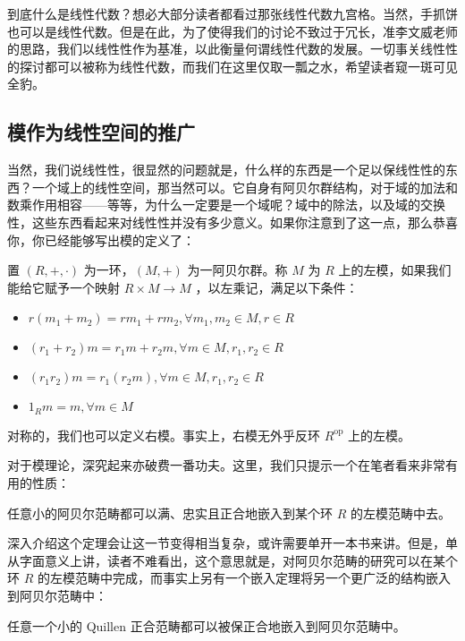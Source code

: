 到底什么是线性代数？想必大部分读者都看过那张线性代数九宫格。当然，手抓饼也可以是线性代数。但是在此，为了使得我们的讨论不致过于冗长，准李文威老师的思路，我们以线性性作为基准，以此衡量何谓线性代数的发展。一切事关线性性的探讨都可以被称为线性代数，而我们在这里仅取一瓢之水，希望读者窥一斑可见全豹。

\subsection{模作为线性空间的推广}

当然，我们说线性性，很显然的问题就是，什么样的东西是一个足以保线性性的东西？一个域上的线性空间，那当然可以。它自身有阿贝尔群结构，对于域的加法和数乘作用相容——等等，为什么一定要是一个域呢？域中的除法，以及域的交换性，这些东西看起来对线性性并没有多少意义。如果你注意到了这一点，那么恭喜你，你已经能够写出模的定义了：

\begin{definition}
    置 $(R, +, \cdot)$ 为一环，$(M, +)$ 为一阿贝尔群。称 $M$ 为 $R$ 上的左模，如果我们能给它赋予一个映射 $R \times M \to M$ ，以左乘记，满足以下条件：

    \begin{itemize}
        \item $r(m_1 + m_2) = rm_1 + rm_2, \forall m_1, m_2 \in M, r \in R$
        \item $(r_1 + r_2)m = r_1m + r_2m, \forall m \in M, r_1, r_2 \in R$
        \item $(r_1r_2)m = r_1(r_2m), \forall m \in M, r_1, r_2 \in R$
        \item $1_Rm = m, \forall m \in M$
    \end{itemize}

    对称的，我们也可以定义右模。事实上，右模无外乎反环 $R^{\mathrm{op}}$ 上的左模。
\end{definition}

对于模理论，深究起来亦破费一番功夫。这里，我们只提示一个在笔者看来非常有用的性质：

\begin{theorem}
    任意小的阿贝尔范畴都可以满、忠实且正合地嵌入到某个环 $R$ 的左模范畴中去。
\end{theorem}

深入介绍这个定理会让这一节变得相当复杂，或许需要单开一本书来讲。但是，单从字面意义上讲，读者不难看出，这个意思就是，对阿贝尔范畴的研究可以在某个环 $R$ 的左模范畴中完成，而事实上另有一个嵌入定理将另一个更广泛的结构嵌入到阿贝尔范畴中：

\begin{theorem}
    任意一个小的 Quillen 正合范畴都可以被保正合地嵌入到阿贝尔范畴中。
\end{theorem}

